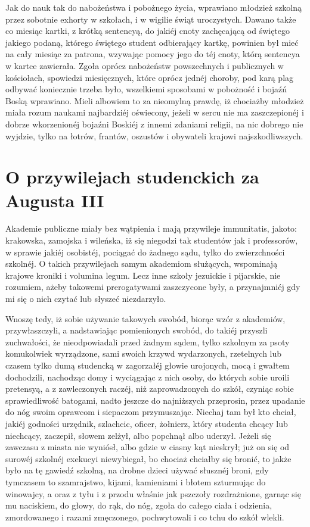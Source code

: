 \documentclass{book}
\begin{document}
Jak do nauk tak do nabożeństwa i pobożnego życia, wprawiano młodzież szkolną przez sobotnie exhorty w szkołach, i w wigilie świąt uroczystych. Dawano także co miesiąc kartki, z krótką sentencyą, do jakiéj cnoty zachęcającą od świętego jakiego podaną, którego świętego student odbierający kartkę, powinien był mieć na cały miesiąc za patrona, wzywając pomocy jego do téj cnoty, którą sentencya w kartce zawierała. Zgoła oprócz nabożeństw powszechnych i publicznych w kościołach, spowiedzi miesięcznych, które oprócz jednéj choroby, pod karą plag odbywać koniecznie trzeba było, wszelkiemi sposobami w pobożność i bojaźń Boską wprawiano. Mieli albowiem to za nieomylną prawdę, iż chociażby młodzież miała rozum naukami najbardziéj oświecony, jeżeli w sercu nie ma zaszczepionéj i dobrze wkorzenionéj bojaźni Boskiéj z innemi zdaniami religii, na nic dobrego nie wyjdzie, tylko na łotrów, frantów, oszustów i obywateli krajowi najszkodliwszych.

\section{O przywilejach studenckich za Augusta III}

Akademie publiczne miały bez wątpienia i mają przywileje immunitatis, jakoto: krakowska, zamojska i wileńska, iż się niegodzi tak studentów jak i professorów, w sprawie jakiéj osobistéj, pociągać do żadnego sądu, tylko do zwierzchności szkolnéj. O takich przywilejach samym akademiom służących, wspominają krajowe kroniki i volumina legum. Lecz inne szkoły jezuickie i pijarskie, nie rozumiem, ażeby takowemi prerogatywami zaszczycone były, a przynajmniéj gdy mi się o nich czytać lub słyszeć niezdarzyło.

Wnoszę tedy, iż sobie używanie takowych swobód, biorąc wzór z akademiów, przywłaszczyli, a nadstawiając pomienionych swobód, do takiéj przyszli zuchwałości, że nieodpowiadali przed żadnym sądem, tylko szkolnym za psoty komukolwiek wyrządzone, sami swoich krzywd wydarzonych, rzetelnych lub czasem tylko dumą studencką w zagorzałéj głowie urojonych, mocą i gwałtem dochodzili, nachodząc domy i wyciągając z nich osoby, do których sobie uroili pretensyą, a z zawleczonych raczéj, niż zaprowadzonych do szkół, czyniąc sobie sprawiedliwość batogami, nadto jeszcze do najniższych przeprosin, przez upadanie do nóg swoim oprawcom i siepaczom przymuszając. Niechaj tam był kto chciał, jakiéj godności urzędnik, szlachcic, oficer, żołnierz, który studenta chcący lub niechcący, zaczepił, słowem zelżył, albo popchnął albo uderzył. Jeżeli się zawczasu z miasta nie wyniósł, albo gdzie w ciasny kąt nieskrył; już on się od surowéj szkolnéj exekucyi niewybiegał, bo chociaż chciałby się bronić, to jakże było na tę gawiedź szkolną, na drobne dzieci używać słusznéj broni, gdy tymczasem to szamrajstwo, kijami, kamieniami i błotem szturmując do winowajcy, a oraz z tyłu i z przodu właśnie jak pszczoły rozdrażnione, garnąc się mu naciskiem, do głowy, do rąk, do nóg, zgoła do całego ciała i odzienia, zmordowanego i razami zmęczonego, pochwytowali i co tchu do szkół wlekli.
\end{document}
